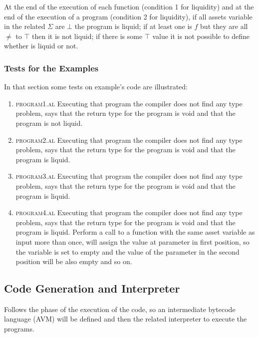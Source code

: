 \documentclass[11pt]{article} %
\begin{document}
\medskip

At the end of the execution of each function (condition 1 for liquidity) and at the end of the execution of a program (condition 2 for liquidity), if all assets variable in the related $\Sigma$ are $\bot$ the program is liquid; if at least one is $f$ but they are all $\neq$ to $\top$ then it is not liquid; if there is some $\top$ value it is not possible to define whether is liquid or not.

\subsubsection{Tests for the Examples}
In that section some tests on example's code are illustrated:
\begin{enumerate}
\item \textsc{program1.al}	
Executing that program the compiler does not find any type problem, says that the return type for the program is void and that the program is not liquid. 
\item \textsc{program2.al}	
Executing that program the compiler does not find any type problem, says that the return type for the program is void and that the program is liquid. 
\item \textsc{program3.al}	
Executing that program the compiler does not find any type problem, says that the return type for the program is void and that the program is liquid. 
\item \textsc{program4.al}   
Executing that program the compiler does not find any type problem, says that the return type for the program is void and that the program is liquid. Perform a call to a function with the same asset variable as input more than once, will assign the value at parameter in first position, so the variable is set to empty and the value of the parameter in the second position will be also empty and so on.
\end{enumerate}
%
%


\subsection{Code Generation and Interpreter}
Follows the phase of the execution of the code, so an intermediate bytecode language (AVM) will be defined and then the related interpreter to execute the programs.
\end{document}
